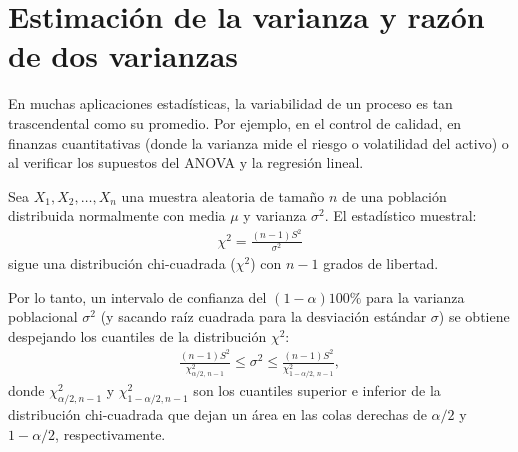 \section{Estimación de la varianza y razón de dos varianzas}

En muchas aplicaciones estadísticas, la variabilidad de un proceso es tan trascendental como su promedio. Por ejemplo, en el control de calidad, en finanzas cuantitativas (donde la varianza mide el riesgo o volatilidad del activo) o al verificar los supuestos del ANOVA y la regresión lineal.

\begin{teorema}
	Sea $X_1, X_2, \ldots, X_n$ una muestra aleatoria de tamaño $n$ de una población distribuida normalmente con media $\mu$ y varianza $\sigma^2$. El estadístico muestral:
	\begin{align}
		\chi^2 = \frac{(n-1)S^2}{\sigma^2}
	\end{align}
	sigue una distribución chi-cuadrada ($\chi^2$) con $n-1$ grados de libertad.

	Por lo tanto, un intervalo de confianza del $(1-\alpha)100\%$ para la varianza poblacional $\sigma^2$ (y sacando raíz cuadrada para la desviación estándar $\sigma$) se obtiene despejando los cuantiles de la distribución $\chi^2$:
	\begin{align}
		\frac{(n-1)S^2}{\chi^2_{\alpha/2, \, n-1}} \leq \sigma^2 \leq \frac{(n-1)S^2}{\chi^2_{1-\alpha/2, \, n-1}},
	\end{align}
	donde $\chi^2_{\alpha/2, n-1}$ y $\chi^2_{1-\alpha/2, n-1}$ son los cuantiles superior e inferior de la distribución chi-cuadrada que dejan un área en las colas derechas de $\alpha/2$ y $1-\alpha/2$, respectivamente.
\end{teorema}

